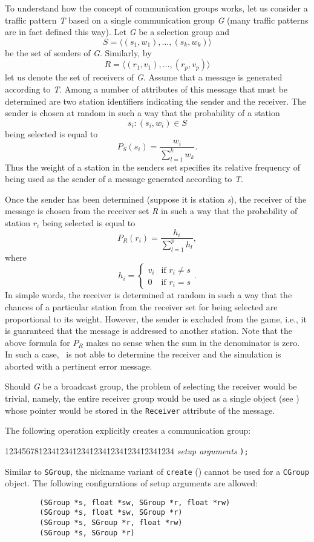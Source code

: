 To understand how the concept of communication groups
works, let us consider
a traffic pattern {\em T\/} based on a single communication
group {\em G\/} (many traffic patterns are in fact defined this way).
Let {\em G\/} be a selection group and
\[
S = \langle (s_1, w_1), \ldots ,(s_k, w_k) \rangle
\]
be the set of senders of {\em G}.
Similarly, by
\[
R = \langle (r_1, v_1) , \ldots ,(r_p, v_p) \rangle
\]
let us denote the set of receivers of {\em G}.
Assume that a message is generated according to {\em T}.
Among a number of attributes of this message that must be determined are
two station identifiers indicating the sender and the receiver.
The sender is chosen at random in such a way that the probability of a
station
\[
s_i: (s_i, w_i) \in S
\]
being selected is equal to
\[
P_S (s_i) = \frac{w_i}{\sum_{l=1}^k w_k}.
\]
Thus the weight of a station in the senders set specifies its relative
frequency of being used
as the sender of a message generated according to {\em T}.

Once the sender has been determined
(suppose it is station {\em s\/}),
the receiver of the message is chosen from
the receiver set {\em R\/} in such a way that the probability of
station $r_i$ being selected is equal to
\[
P_R (r_i) = \frac{h_i}{\sum_{l=1}^p h_l},
\]
where
\[
h_i = \left\{ \begin{array}{ll}
v_i & \mbox{if  $r_i \neq s$} \\
0   & \mbox{if  $r_i = s$}
\end{array}
      \right. .
\]
\noindent
In simple words, the receiver is determined at random in such a way that the
chances of a particular station from the receiver set for being selected
are proportional to its weight.
However, the sender is excluded from the game, i.e.,
it is guaranteed that the message is addressed to another station. Note that the
above formula for $P_R$ makes no sense when the sum in the denominator
is zero.
In such a case, \smurph\ is not able to determine the receiver and the
simulation is aborted with a pertinent error message.

Should {\em G\/} be a broadcast group, the problem of selecting the receiver would
be trivial, namely, the entire receiver group would be used as a single
object (see ) whose pointer would be stored in the
{\tt Receiver} attribute of the message.

The following operation explicitly creates a communication group:
{\tt\begin{tabbing}
12345678\=1234\=1234\=1234\=1234\=1234\=1234\=1234\=1234\kill
{} {\em setup arguments} {\tt );}
\end{tabbing}}
\noindent
Similar to {\tt SGroup}, the nickname variant of {\tt create}
() cannot be used for a {\tt CGroup} object.
The following configurations of setup arguments are allowed:
\begin{verbatim}
        (SGroup *s, float *sw, SGroup *r, float *rw)
        (SGroup *s, float *sw, SGroup *r)
        (SGroup *s, SGroup *r, float *rw)
        (SGroup *s, SGroup *r)
\end{verbatim}

